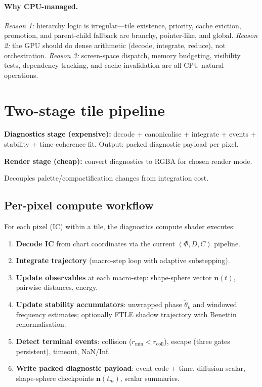 \documentclass[11pt]{report}
\begin{document}
\paragraph{Why CPU-managed.} \emph{Reason 1:} hierarchy logic is irregular---tile existence, priority, cache eviction, promotion, and parent-child fallback are branchy, pointer-like, and global. \emph{Reason 2:} the GPU should do dense arithmetic (decode, integrate, reduce), not orchestration. \emph{Reason 3:} screen-space dispatch, memory budgeting, visibility tests, dependency tracking, and cache invalidation are all CPU-natural operations.

\section{Two-stage tile pipeline}
\label{sec:two_stage}

\textbf{Diagnostics stage (expensive):} decode + canonicalise + integrate + events + stability + time-coherence fit. Output: packed diagnostic payload per pixel.

\textbf{Render stage (cheap):} convert diagnostics to RGBA for chosen render mode.

Decouples palette/compactification changes from integration cost.

\subsection{Per-pixel compute workflow}

For each pixel (IC) within a tile, the diagnostics compute shader executes:

\begin{enumerate}[nosep]
\item \textbf{Decode IC} from chart coordinates via the current $(\Phi, D, C)$ pipeline.
\item \textbf{Integrate trajectory} (macro-step loop with adaptive substepping).
\item \textbf{Update observables} at each macro-step: shape-sphere vector $\mathbf n(t)$, pairwise distances, energy.
\item \textbf{Update stability accumulators}: unwrapped phase $\tilde\theta_k$ and windowed frequency estimates; optionally FTLE shadow trajectory with Benettin renormalisation.
\item \textbf{Detect terminal events}: collision ($r_{\min}<r_{\text{coll}}$), escape (three gates persistent), timeout, NaN/Inf.
\item \textbf{Write packed diagnostic payload}: event code + time, diffusion scalar, shape-sphere checkpoints $\mathbf n(t_m)$, scalar summaries.
\end{enumerate}
\end{document}

